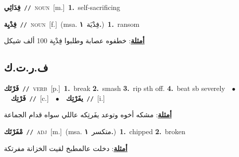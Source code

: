 \documentclass[10pt,a4paper,twoside]{article} %
\begin{document}
\begin{multicols}{2}
{\setlength\topsep{0pt}\textbf{\foreignlanguage{arabic}{فِدَائِي}}\ {\color{gray}\texttt{//}\color{black}}\ \textsc{noun}\ [m.]\ \textbf{1.}~self-sacrificing\ } \vspace{2mm}

{\setlength\topsep{0pt}\textbf{\foreignlanguage{arabic}{فِدْيِة}}\ {\color{gray}\texttt{//}\color{black}}\ \textsc{noun}\ [f.]\ \color{gray}(msa. \foreignlanguage{arabic}{فِدْيَة}~\foreignlanguage{arabic}{\textbf{١.}})\color{black}\ \textbf{1.}~ransom\  \begin{flushright}\color{gray}\foreignlanguage{arabic}{\textbf{\underline{\foreignlanguage{arabic}{أمثلة}}}: خطفوه عصابة وطلبوا فِدْيِة 100 ألف شيكل}\end{flushright}\color{black}} \vspace{2mm}

\vspace{-3mm}
\subsection*{\color{blue}\foreignlanguage{arabic}{ف.ر.ت.ك}\color{blue}{}} 

{\setlength\topsep{0pt}\textbf{\foreignlanguage{arabic}{فَرْتَك}}\ {\color{gray}\texttt{//}\color{black}}\ \textsc{verb}\ [p.]\ \textbf{1.}~break  \textbf{2.}~smash  \textbf{3.}~rip sth off.  \textbf{4.}~beat sb severely\ \ $\bullet$\ \ \setlength\topsep{0pt}\textbf{\foreignlanguage{arabic}{فَرْتِك}}\ {\color{gray}\texttt{//}\color{black}}\ [c.]\ \ $\bullet$\ \ \setlength\topsep{0pt}\textbf{\foreignlanguage{arabic}{يفَرْتِك}}\ {\color{gray}\texttt{//}\color{black}}\ [i.]\  \begin{flushright}\color{gray}\foreignlanguage{arabic}{\textbf{\underline{\foreignlanguage{arabic}{أمثلة}}}: مشكه أخوه وتوعد يفَرتِكه عاللي سواه قدام الجماعة}\end{flushright}\color{black}} \vspace{2mm}

{\setlength\topsep{0pt}\textbf{\foreignlanguage{arabic}{مْفَرْتَك}}\ {\color{gray}\texttt{//}\color{black}}\ \textsc{adj}\ [m.]\ \color{gray}(msa. \foreignlanguage{arabic}{متكسر}~\foreignlanguage{arabic}{\textbf{١.}})\color{black}\ \textbf{1.}~chipped  \textbf{2.}~broken\  \begin{flushright}\color{gray}\foreignlanguage{arabic}{\textbf{\underline{\foreignlanguage{arabic}{أمثلة}}}: دخلت عالمطبخ لقيت الخزانة مفرتكة}\end{flushright}\color{black}} \vspace{2mm}


\end{multicols}
\end{document}
